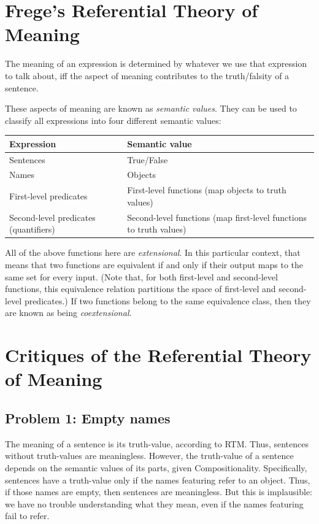 \section{Frege's Referential Theory of Meaning}

\begin{definition}
The meaning of an expression is determined by whatever we use that expression to talk about, iff the aspect of meaning contributes to the truth/falsity of a sentence.
\end{definition}

These aspects of meaning are known as \emph{semantic values}. They can be used to classify all expressions into four different semantic values:

\begin{center}
\begin{tabular}{p{}p{}}
\toprule
Expression & Semantic value \\
\midrule
Sentences & True/False \\
Names & Objects \\
First-level predicates & First-level functions (map objects to truth values) \\
Second-level predicates (quantifiers) & Second-level functions (map first-level functions to truth values) \\
\bottomrule
\end{tabular}
\end{center}

All of the above functions here are \emph{extensional}. In this particular context, that means that two functions are equivalent if and only if their output maps to the same set for every input. (Note that, for both first-level and second-level functions, this equivalence relation partitions the space of first-level and second-level predicates.) If two functions belong to the same equivalence class, then they are known as being \emph{coextensional}.

\section{Critiques of the Referential Theory of Meaning}

\subsection*{Problem 1: Empty names}

The meaning of a sentence is its truth-value, according to RTM. Thus, sentences without truth-values are meaningless. However, the truth-value of a sentence depends on the semantic values of its parts, given Compositionality. Specifically, sentences have a truth-value only if the names featuring refer to an object. Thus, if those names are empty, then sentences are meaningless. But this is implausible: we have no trouble understanding what they mean, even if the names featuring fail to refer.

